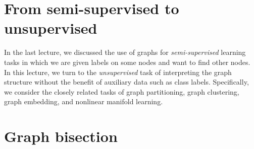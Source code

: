 \documentclass[12pt, leqno]{article} %
\begin{document}


\section{From semi-supervised to unsupervised}

In the last lecture, we discussed the use of graphs for
{\em semi-supervised} learning tasks in which we are given labels on some
nodes and want to find other nodes.  In this lecture, we turn to the
{\em unsupervised} task of interpreting the graph structure without
the benefit of auxiliary data such as class labels.  Specifically, we
consider the closely related tasks of graph partitioning, graph
clustering, graph embedding, and nonlinear manifold learning.

\section{Graph bisection}
\end{document}
